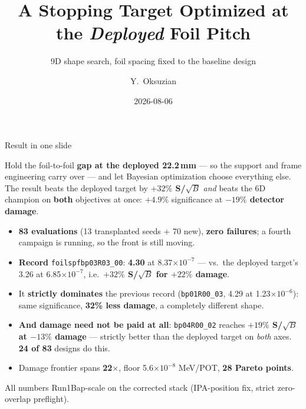\documentclass[aspectratio=169,10pt]{beamer}
\title[Shape at Deployed Pitch]{A Stopping Target Optimized at the \emph{Deployed} Foil Pitch}
\subtitle{9D shape search, foil spacing fixed to the baseline design}
\author{Y.\ Oksuzian}
\institute[Mu2e autoresearch]{Mu2e --- autoresearch / closed-loop Bayesian optimization}
\date{2026-08-06}
\begin{document}
\begin{frame}
\titlepage
\end{frame}

\begin{frame}{Result in one slide}
\begin{block}{}
Hold the foil-to-foil \textbf{gap at the deployed 22.2\,mm} --- so the support and
frame engineering carry over --- and let Bayesian optimization choose everything else.
The result beats the deployed target by \textbf{$+32\%$ S/$\sqrt{B}$} \emph{and} beats the
6D champion on \textbf{both} objectives at once: $+4.9\%$ significance at
\textbf{$-19\%$ detector damage}.
\end{block}
\vspace{0.4em}
\begin{itemize}
  \item \textbf{83 evaluations} (13 transplanted seeds $+$ 70 new), \textbf{zero failures};
        a fourth campaign is running, so the front is still moving.
  \item \textbf{Record} \texttt{foilspfbp03R03\_00}: \textbf{4.30} at
        8.37$\times10^{-7}$ --- vs.\ the deployed target's 3.26 at 6.85$\times10^{-7}$,
        i.e.\ \textbf{$+32\%$ S/$\sqrt{B}$ for $+22\%$ damage}.
  \item It \textbf{strictly dominates} the previous record (\texttt{bp01R00\_03},
        4.29 at 1.23$\times10^{-6}$): same significance, \textbf{32\% less damage},
        a completely different shape.
  \item \textbf{And damage need not be paid at all}: \texttt{bp04R00\_02} reaches
        \textbf{$+19\%$ S/$\sqrt{B}$ at $-13\%$ damage} --- strictly better than the
        deployed target on \emph{both} axes. \textbf{24 of 83} designs do this.
  \item Damage frontier spans \textbf{22$\times$}, floor 5.6$\times10^{-8}$ MeV/POT,
        \textbf{28 Pareto points}.
\end{itemize}
\vspace{0.2em}
\footnotesize
All numbers Run1Bap-scale on the corrected stack (IPA-position fix, strict
zero-overlap preflight).
\end{frame}
\end{document}
